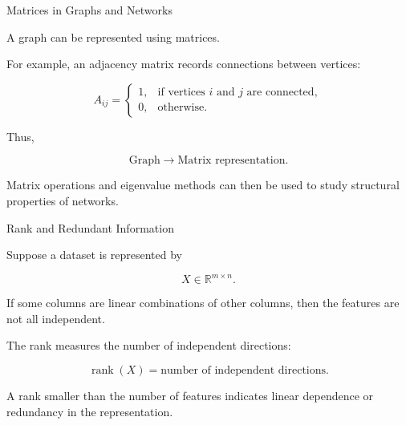 
\begin{frame}{Matrices in Graphs and Networks}

A graph can be represented using matrices.

For example, an adjacency matrix records connections
between vertices:

\[
A_{ij}
=
\begin{cases}
1,&\text{if vertices }i\text{ and }j\text{ are connected},\\
0,&\text{otherwise}.
\end{cases}
\]

Thus,

\[
\boxed{
\text{Graph}
\longrightarrow
\text{Matrix representation}.
}
\]

Matrix operations and eigenvalue methods can then be
used to study structural properties of networks.

\end{frame}



\begin{frame}{Rank and Redundant Information}

Suppose a dataset is represented by

\[
X\in\mathbb{R}^{m\times n}.
\]

If some columns are linear combinations of other columns,
then the features are not all independent.

The rank measures the number of independent directions:

\[
\boxed{
\operatorname{rank}(X)
=
\text{number of independent directions}.
}
\]

A rank smaller than the number of features indicates
linear dependence or redundancy in the representation.

\end{frame}



